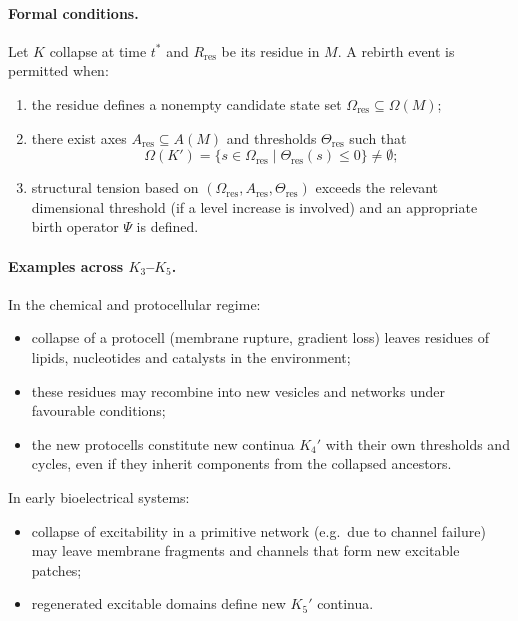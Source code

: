 \paragraph{Formal conditions.}
Let \(K\) collapse at time \(t^{\ast}\) and \(R_{\mathrm{res}}\) be its
residue in \(M\). A rebirth event is permitted when:
\begin{enumerate}
  \item the residue defines a nonempty candidate state set
        \(\Omega_{\mathrm{res}}\subseteq \Omega(M)\);
  \item there exist axes \(A_{\mathrm{res}}\subseteq A(M)\) and thresholds
        \(\Theta_{\mathrm{res}}\) such that
        \[
          \Omega(K') =
            \{ s\in \Omega_{\mathrm{res}}
               \mid \Theta_{\mathrm{res}}(s)\le 0
            \}
          \neq \emptyset;
        \]
  \item structural tension based on \((\Omega_{\mathrm{res}},A_{\mathrm{res}},
        \Theta_{\mathrm{res}})\) exceeds the relevant dimensional threshold
        (if a level increase is involved) and an appropriate birth operator
        \(\Psi\) is defined.
\end{enumerate}

\paragraph{Examples across \texorpdfstring{\(K_3\)}{K_3}–\texorpdfstring{\(K_5\)}{K_5}.}
In the chemical and protocellular regime:
\begin{itemize}
  \item collapse of a protocell (membrane rupture, gradient loss) leaves
        residues of lipids, nucleotides and catalysts in the environment;
  \item these residues may recombine into new vesicles and networks under
        favourable conditions;
  \item the new protocells constitute new continua \(K_4'\) with their own
        thresholds and cycles, even if they inherit components from the
        collapsed ancestors.
\end{itemize}

In early bioelectrical systems:
\begin{itemize}
  \item collapse of excitability in a primitive network (e.g.\ due to
        channel failure) may leave membrane fragments and channels that form
        new excitable patches;
  \item regenerated excitable domains define new \(K_5'\) continua.
\end{itemize}

